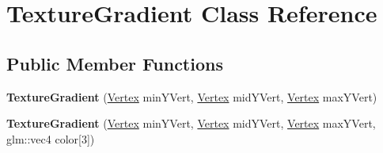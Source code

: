 \hypertarget{class_texture_gradient}{}\section{Texture\+Gradient Class Reference}
\label{class_texture_gradient}
\subsection*{Public Member Functions}
\begin{DoxyCompactItemize}
\item 
\hypertarget{class_texture_gradient_ac52b7944976524744bcc35ec9918b09c}{}{\bfseries Texture\+Gradient} (\hyperlink{struct_vertex}{Vertex} min\+Y\+Vert, \hyperlink{struct_vertex}{Vertex} mid\+Y\+Vert, \hyperlink{struct_vertex}{Vertex} max\+Y\+Vert)\label{class_texture_gradient_ac52b7944976524744bcc35ec9918b09c}

\item 
\hypertarget{class_texture_gradient_a1aac43bd7935b57410122be0affa0896}{}{\bfseries Texture\+Gradient} (\hyperlink{struct_vertex}{Vertex} min\+Y\+Vert, \hyperlink{struct_vertex}{Vertex} mid\+Y\+Vert, \hyperlink{struct_vertex}{Vertex} max\+Y\+Vert, glm\+::vec4 color\mbox{[}3\mbox{]})\label{class_texture_gradient_a1aac43bd7935b57410122be0affa0896}

\end{DoxyCompactItemize}
